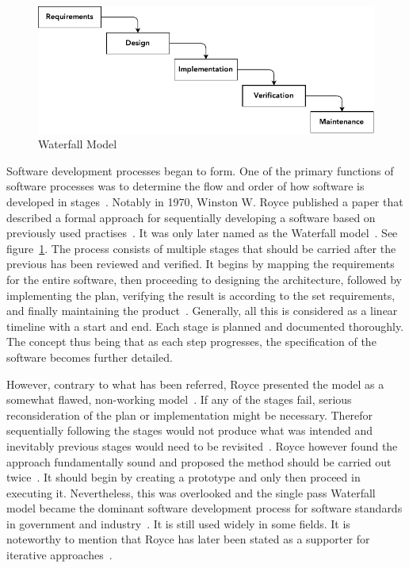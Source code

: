 \documentclass[english]{tktltiki2}
\begin{document}
\begin{figure}[h!]

    \vspace{1cm}
    \centering

    \includegraphics{figures/waterfall-model}

    \caption{Waterfall Model}
    \label{figure:waterfall-model}

    \vspace{1cm}

\end{figure}

Software development processes began to form. One of the primary functions of software processes was to determine the flow and order of how software is developed in stages~\cite{Boe88}. Notably in 1970, Winston W. Royce published a paper that described a formal approach for sequentially developing a software based on previously used practises~\cite{Roy70}. It was only later named as the Waterfall model~\cite{Boe88, LB03}. See figure~\ref{figure:waterfall-model}. The process consists of multiple stages that should be carried after the previous has been reviewed and verified. It begins by mapping the requirements for the entire software, then proceeding to designing the architecture, followed by implementing the plan, verifying the result is according to the set requirements, and finally maintaining the product~\cite{Roy70}. Generally, all this is considered as a linear timeline with a start and end. Each stage is planned and documented thoroughly. The concept thus being that as each step progresses, the specification of the software becomes further detailed.

However, contrary to what has been referred, Royce presented the model as a somewhat flawed, non-working model~\cite{Roy70}. If any of the stages fail, serious reconsideration of the plan or implementation might be necessary. Therefor sequentially following the stages would not produce what was intended and inevitably previous stages would need to be revisited~\cite{Roy70}. Royce however found the approach fundamentally sound and proposed the method should be carried out twice~\cite{Roy70, Boe88}. It should begin by creating a prototype and only then proceed in executing it. Nevertheless, this was overlooked and the single pass Waterfall model became the dominant software development process for software standards in government and industry~\cite{Boe88, LB03}. It is still used widely in some fields. It is noteworthy to mention that Royce has later been stated as a supporter for iterative approaches~\cite{LB03}.
\end{document}
